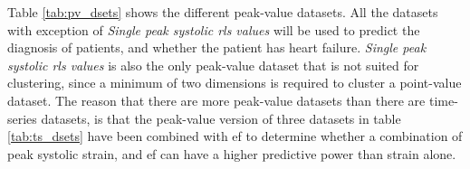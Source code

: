 Table \ref{tab:pv_dsets} shows the different peak-value datasets. 
All the datasets with exception of \textit{Single peak systolic \acrshort{rls} values} will be used to predict the diagnosis of patients, 
and whether the patient has heart failure. \textit{Single peak systolic \acrshort{rls} values} is also the only peak-value dataset that is not suited for clustering, 
since a minimum of two dimensions is required to cluster a point-value dataset. The reason that there are more peak-value datasets than there are time-series datasets, 
is that the peak-value version of three datasets in table \ref{tab:ts_dsets} have been combined with \acrshort{ef} to determine whether a combination of peak systolic strain,
and \acrshort{ef} can have a higher predictive power than strain alone.

